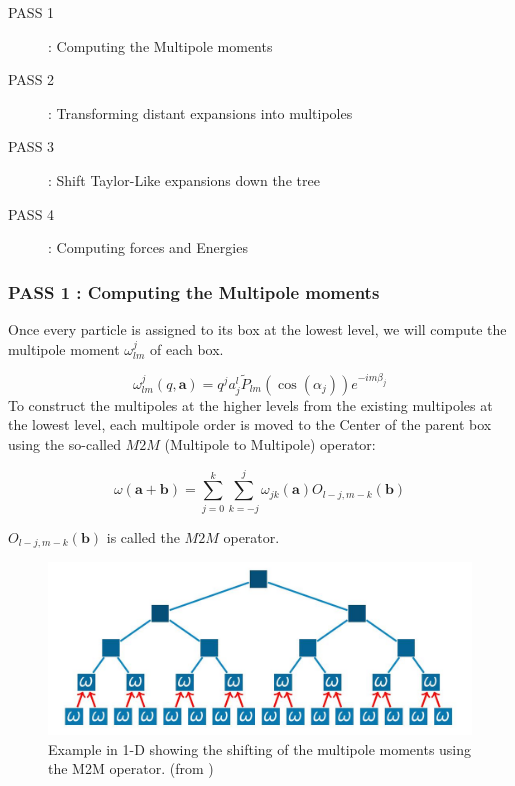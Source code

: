 \documentclass[10pt,twoside,a4paper]{report}
\begin{document}
	\begin{description}
	\item[PASS 1] : Computing the Multipole moments
	\item[PASS 2] : Transforming distant expansions into multipoles
	\item[PASS 3] : Shift Taylor-Like expansions down the tree
	\item[PASS 4] : Computing forces and Energies
	
	\end{description}
		
	
	    
    
    
    \subsubsection{PASS 1 : Computing the Multipole moments}
    
    Once every particle is assigned to its box at the lowest level, we will compute the multipole moment $\omega_{lm}^j$ of each box.
    
    \begin{equation}
    \omega_{lm}^{j}(q,\textbf{a}) = q^j a_j^l \widetilde{P}_{lm}(\cos(\alpha_j))e^{-im\beta_j}
    \end{equation}
%
To construct the multipoles at the higher levels from the existing multipoles at the lowest level, each multipole order is moved to the Center of the parent box using the so-called $M2M$ (Multipole to Multipole) operator:    
    
    \begin{equation}
    \omega(\textbf{a} + \textbf{b}) = \sum\limits_{j=0}^{k} \sum\limits_{k=-j}^{j} \omega_{jk}(\textbf{a}) O_{l-j,m-k}(\textbf{b})
    \end{equation}

   $O_{l-j,m-k}(\textbf{b})$ is called the $M2M$ operator.
   
   \begin{figure}[H]
   \includegraphics[scale=0.4]{ShiftMultipole}
    \centering 
    \caption{Example in 1-D showing the shifting of the multipole moments using the M2M operator. (from \cite{phdIvo}) }
    \label{fig:multipole}
   \end{figure}
   
\end{document}
